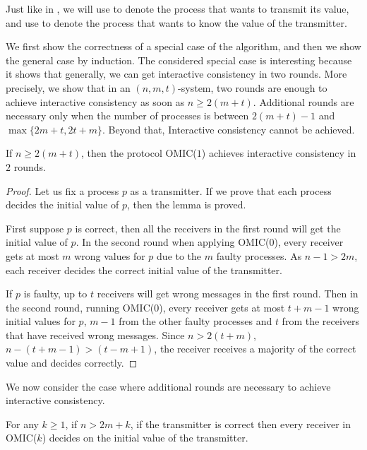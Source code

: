 Just like in
{\cite{lamport1982byzantine}}, we will use  to denote the process
that wants to transmit its value, and use  to denote the process that wants to know the value of the transmitter. 

We first show the correctness of a special case of the algorithm, and then 
we show the general case by induction.
The considered special case is interesting because it shows that generally, we can get interactive consistency in two rounds.
More precisely, we show that in an $( n,m,t)$-system, two rounds are enough to achieve interactive consistency as soon as 
$n \geqslant 2 ( m+t )$.
Additional rounds are necessary only when the number of processes is between $2 ( m+t ) - 1$ and $ \max \{ 2m+t,2t+m \}$. Beyond that, Interactive consistency cannot be achieved.


\begin{lemma} \label{basicCase}
  \label{2roundlemma} If $n \geqslant 2 ( m+t )$, then the protocol OMIC($1$) achieves
  interactive consistency in $2$ rounds.
\end{lemma}

\begin{proof}
  Let us fix a process $p$ as a transmitter. If we prove that  each process decides  the
  initial value of $p$, then the lemma is proved.
  
  First suppose $p$ is correct, then all the receivers in the
  first round will get the initial value of $p$. In the second
  round when applying OMIC($0$), every receiver gets at most $m$ wrong
  values for $p$ due to the $m$ faulty processes.
As $n-1>2m$, each
  receiver decides the correct initial value of the transmitter.
  
  If $p$ is faulty, up to $t$ receivers will get wrong messages
  in the first round. Then in the second round, running OMIC($0$), every
  receiver gets at most $t+m-1$ wrong initial values for $p$,
  $m-1$ from the other faulty processes and $t$ from the receivers that have received wrong messages.
   Since $n>2 (t+m)$, $n-(t+m-1) > (t-m+1)$, the receiver receives a majority of the correct value and decides correctly.
\end{proof}

We now consider the case where additional rounds are necessary to achieve interactive consistency.

\begin{lemma} \label{reliableCorretness}
  \label{reliablecase}
  For any $k \geqslant 1$, if $n>2m+k$, if the transmitter is correct
 then every receiver in  OMIC($k$) decides on the initial value of the transmitter.
\end{lemma}

